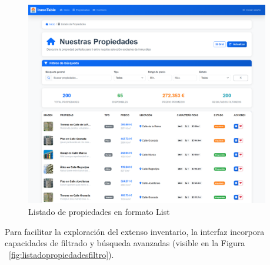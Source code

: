 \begin{enumerate}
\begin{enumerate}
        \begin{figure}[H]
            \begin{center}
                \includegraphics[width = 0.95\textwidth]{Figuras/listadopropiedadeslist.png}
            \end{center}
            \caption{\label{fig:listadopropiedadeslist} Listado de propiedades en formato List}
        \end{figure}

        Para facilitar la exploración del extenso inventario, la interfaz incorpora capacidades de filtrado y búsqueda avanzadas (visible en la Figura ~\ref{fig:listadopropiedadesfiltro}).
        

\end{enumerate}
\end{enumerate}
